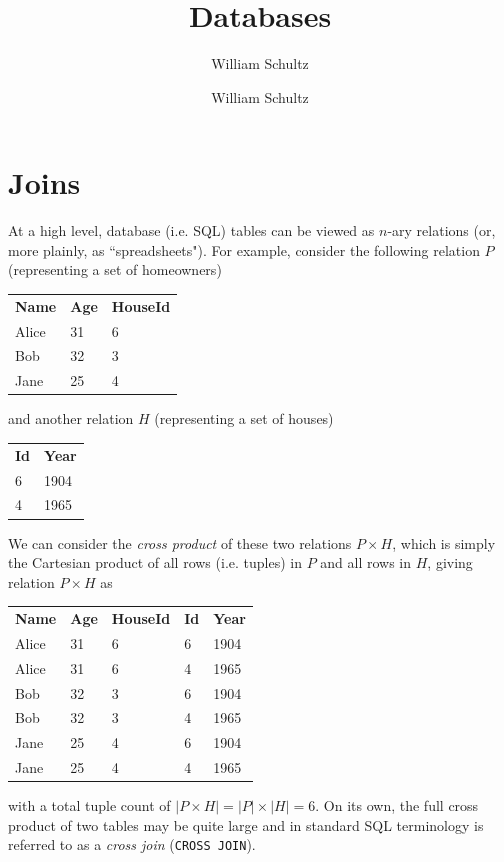 \documentclass[10pt,a4paper]{article}
\author{William Schultz}
\begin{document}
\title{Databases}
\author{William Schultz}
\maketitle

\newcommand{\NULL}{\colorbox{lightgray}{\texttt{NULL}}}

\section{Joins}

At a high level, database (i.e. SQL) tables can be viewed as $n$-ary relations (or, more plainly, as ``spreadsheets"). For example, consider the following relation $P$ (representing a set of homeowners)
\begin{center}
\begin{tabular}{| l | l | l |}
     \textbf{Name} & \textbf{Age} & \textbf{HouseId} \\ 
     Alice & 31 & 6 \\  
     Bob & 32 & 3 \\    
     Jane & 25 & 4    
\end{tabular}
\end{center}
and another relation $H$ (representing a set of houses)
\begin{center}
    \begin{tabular}{| l | l |}
         \textbf{Id} & \textbf{Year} \\ 
         6 & 1904 \\ 
         4 & 1965 
\end{tabular}
\end{center}
We can consider the \textit{cross product} of these two relations $P \times H$, which is simply the Cartesian product of all rows (i.e. tuples) in $P$ and all rows in $H$, giving relation $P \times H$ as
\begin{center}
    \begin{tabular}{| l | l | l | l | l |}
        \textbf{Name} & \textbf{Age}& \textbf{HouseId} & \textbf{Id} & \textbf{Year} \\
        Alice & 31 & 6 & 6 & 1904\\  
        Alice & 31 & 6 & 4 & 1965 \\  
        Bob & 32 & 3 & 6 & 1904 \\    
        Bob & 32 & 3 & 4 & 1965  \\    
        Jane & 25 & 4 & 6 & 1904  \\
        Jane & 25 & 4 & 4 & 1965   
\end{tabular}
\end{center}
with a total tuple count of $|P \times H| = |P| \times |H| = 6$. On its own, the full cross product of two tables may be quite large and in standard SQL terminology is referred to as a \textit{cross join} (\texttt{CROSS JOIN}). 
\end{document}
